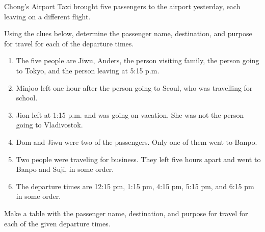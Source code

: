 \documentclass[12pt]{article}
\newenvironment{problem}[2][Problem]{\begin{trivlist}
\item[\hskip \labelsep {\bfseries #1}\hskip \labelsep {\bfseries #2.}]}{\end{trivlist}}
\begin{document}
\begin{problem}{7}
Chong’s Airport Taxi brought five passengers to the airport yesterday, each leaving on a different flight.

Using the clues below, determine the passenger name, destination, and purpose for travel for each of the departure times.

\begin{enumerate}[label=\Roman*.]
      \item The five people are Jiwu, Anders, the person visiting family, the person going to Tokyo, and the person leaving at 5:15 p.m.
      \item Minjoo left one hour after the person going to Seoul, who was travelling for school.
      \item Jion left at 1:15 p.m. and was going on vacation. She was not the person going to Vladivostok.
      \item Dom and Jiwu were two of the passengers. Only one of them went to Banpo.
      \item Two people were traveling for business. They left five hours apart and went to Banpo and Suji, in some order.
      \item The departure times are 12:15 pm, 1:15 pm, 4:15 pm, 5:15 pm, and 6:15 pm in some order.
\end{enumerate}
Make a table with the passenger name, destination, and purpose for travel for each of the given departure times.
\end{problem}
\end{document}
